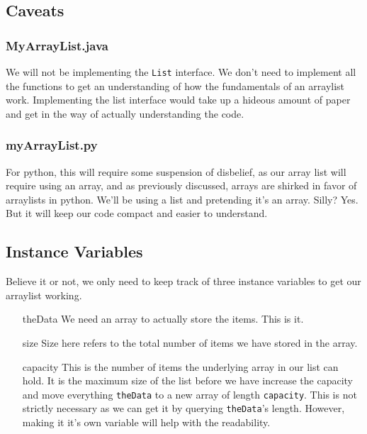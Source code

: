 \subsection{Caveats}

\subsubsection{MyArrayList.java}
We will not be implementing the \texttt{List} interface. We don't need to implement all the functions to get an understanding of how the fundamentals of an arraylist work.
Implementing the list interface would take up a hideous amount of paper and get in the way of actually understanding the code.

\subsubsection{myArrayList.py}

For python, this will require some suspension of disbelief, as our array list will require using an array, and as previously discussed, arrays are shirked in favor of arraylists in python.  We'll be using a list and pretending it's an array. Silly?  Yes.  But it will keep our code compact and easier to understand.


\subsection{Instance Variables}

Believe it or not, we only need to keep track of three instance variables to get our arraylist working.

\begin{enumerate}
	\item[theData]  We need an array to actually store the items.  This is it.
	\item[size] Size here refers to the total number of items we have stored in the array.
	\item[capacity]  This is the number of items  the underlying array in our list can hold. It is the maximum size of the list before we have increase the capacity  and move everything \texttt{theData} to a new array of length \texttt{capacity}.   This is not strictly necessary as we can get it by querying \texttt{theData}'s length. However, making it it's own variable will help with the readability.
\end{enumerate}

